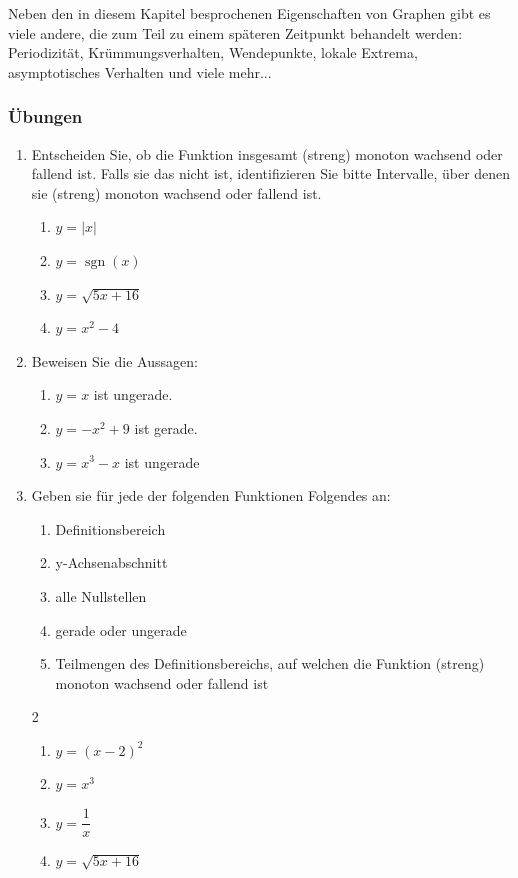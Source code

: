 Neben den in diesem Kapitel besprochenen Eigenschaften von Graphen gibt es viele andere, die zum Teil zu einem späteren Zeitpunkt behandelt werden: Periodizität, Krümmungsverhalten, Wendepunkte, lokale Extrema, asymptotisches Verhalten und viele mehr...
\newpage

\subsubsection{Übungen}
\begin{enumerate}
    \item Entscheiden Sie, ob die Funktion insgesamt (streng) monoton wachsend oder fallend ist. Falls sie das nicht ist, identifizieren Sie bitte Intervalle, über denen sie (streng) monoton wachsend oder fallend ist.
          \begin{enumerate}
              \item $y=|x|$
              \item $y=\operatorname{sgn}(x)$
              \item $y=\sqrt{5x+16}$
              \item $y=x^2-4$
          \end{enumerate}
    \item Beweisen Sie die Aussagen:
          \begin{enumerate}
              \item $y=x$ ist ungerade.
              \item $y=-x^2+9$ ist gerade.
              \item $y=x^3-x$ ist ungerade
          \end{enumerate}
    \item Geben sie für jede der folgenden Funktionen Folgendes an:
          \begin{enumerate}[label=\roman*)]
              \item Definitionsbereich
              \item y-Achsenabschnitt
              \item alle Nullstellen
              \item gerade oder ungerade
              \item Teilmengen des Definitionsbereichs, auf welchen die
                    Funktion (streng) monoton wachsend oder fallend ist
          \end{enumerate}
          \begin{multicols}{2}
              \begin{enumerate}
                  \item $y=(x-2)^2$
                  \item $y=x^3$
                  \item $y=\dfrac{1}{x}$
                  \item $y=\sqrt{5x+16}$
              \end{enumerate}
          \end{multicols}
\end{enumerate}
\newpage
